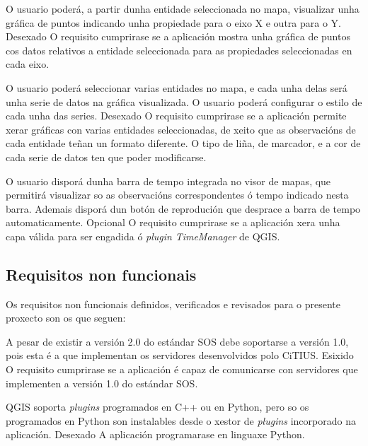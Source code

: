 		  	{O usuario poderá, a partir dunha entidade seleccionada no mapa, visualizar unha gráfica de puntos indicando unha propiedade para o eixo X e outra para o Y.}%
			{Desexado}%
			{O requisito cumprirase se a aplicación mostra unha gráfica de puntos cos datos relativos a entidade seleccionada para as propiedades seleccionadas en cada eixo.}%
			
		  	{O usuario poderá seleccionar varias entidades no mapa, e cada unha delas será unha serie de datos na gráfica visualizada. O usuario poderá configurar o estilo de cada unha das series.}%
			{Desexado}%
			{O requisito cumprirase se a aplicación permite xerar gráficas con varias entidades seleccionadas, de xeito que as observacións de cada entidade teñan un formato diferente. O tipo de liña, de marcador, e a cor de cada serie de datos ten que poder modificarse.}%
			
		  	{O usuario disporá dunha barra de tempo integrada no visor de mapas, que permitirá visualizar so as observacións correspondentes ó tempo indicado nesta barra. Ademais disporá dun botón de reprodución que desprace a barra de tempo automaticamente.}%
			{Opcional}%
			{O requisito cumprirase se a aplicación xera unha capa válida para ser engadida ó \emph{plugin} \emph{TimeManager} de QGIS.}%

\subsection{Requisitos non funcionais}
Os requisitos non funcionais definidos, verificados e revisados para o presente proxecto son os que seguen:

		  	{A pesar de existir a versión 2.0 do estándar SOS debe soportarse a versión 1.0, pois esta é a que implementan os servidores desenvolvidos polo CiTIUS.}%
			{Esixido}%
			{O requisito cumprirase se a aplicación é capaz de comunicarse con servidores que implementen a versión 1.0 do estándar SOS.}%
			
		  	{QGIS soporta \emph{plugins} programados en C++ ou en Python, pero so os programados en Python son instalables desde o xestor de \emph{plugins} incorporado na aplicación.}%
			{Desexado}%
			{A aplicación programarase en linguaxe Python.}%
			
